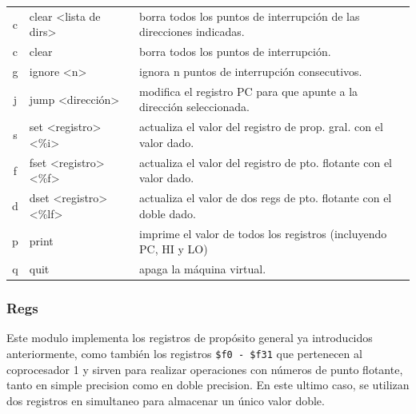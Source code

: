 \documentclass[12pt]{article}
\begin{document}
\begin{table}[H]
\begin{tabular}{@{}cll@{}}
c                         & clear \textless lista de dirs\textgreater              & borra todos los puntos de interrupción de las direcciones indicadas.          \\
c                         & clear                                                        & borra todos los puntos de interrupción.                                       \\
g                         & ignore \textless n\textgreater                                & ignora n puntos de interrupción consecutivos.                                 \\
j                         & jump \textless dirección\textgreater                          & modifica el registro PC para que apunte a la dirección seleccionada.          \\
s                         & set \textless registro\textgreater \textless\%i\textgreater   & actualiza el valor del registro de prop. gral. con el valor dado.             \\
f                         & fset \textless registro\textgreater \textless\%f\textgreater  & actualiza el valor del registro de pto. flotante con el valor dado.           \\
d                         & dset \textless registro\textgreater \textless\%lf\textgreater & actualiza el valor de dos regs de pto. flotante con el doble dado. \\
p                         & print                                                        & imprime el valor de todos los registros (incluyendo PC, HI y LO)              \\
q                         & quit                                                         & apaga la máquina virtual.                                                    
\end{tabular}
\end{table}

\subsubsection{Regs}

Este modulo implementa los registros de propósito general ya introducidos anteriormente, como también los registros \texttt{\$f0 - \$f31} que pertenecen al coprocesador 1 y sirven para realizar operaciones con números de punto flotante, tanto en simple precision como en doble precision. En este ultimo caso, se utilizan dos registros en simultaneo para almacenar un único valor doble.
\end{document}
